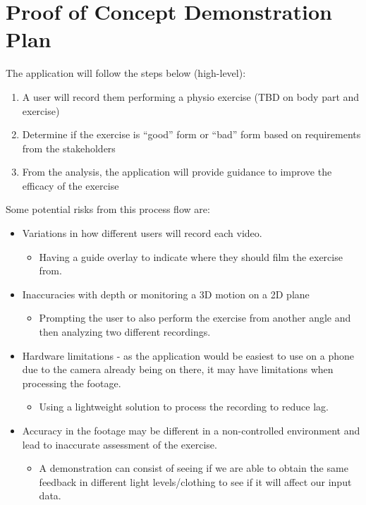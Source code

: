 \documentclass{article}
\begin{document}
\section{Proof of Concept Demonstration Plan}

The application will follow the steps below (high-level):
\begin{enumerate}
  \item A user will record them performing a physio exercise (TBD on body part and exercise)
  \item Determine if the exercise is “good” form or “bad” form based on requirements from the stakeholders
  \item From the analysis, the application will provide guidance to improve the efficacy of the exercise
\end{enumerate}


Some potential risks from this process flow are:
\begin{itemize}
  \item Variations in how different users will record each video.
  \begin{itemize}
    \item Having a guide overlay to indicate where they should film the exercise from.
  \end{itemize}  
  \item Inaccuracies with depth or monitoring a 3D motion on a 2D plane
  \begin{itemize}
    \item Prompting the user to also perform the exercise from another angle and then analyzing two different recordings.
  \end{itemize}
  \item Hardware limitations - as the application would be easiest to use on a phone due to the camera already being on there, it may have limitations when processing the footage.
  \begin{itemize}
    \item Using a lightweight solution to process the recording to reduce lag.
  \end{itemize}
  \item Accuracy in the footage may be different in a non-controlled environment and lead to inaccurate assessment of the exercise. 
  \begin{itemize}
    \item A demonstration can consist of seeing if we are able to obtain the same feedback in different light levels/clothing to see if it will affect our input data.
  \end{itemize} 
\end{itemize}
\end{document}
